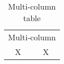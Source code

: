 \begin{table}[ht]
\caption{Multi-column table}
\begin{center}
\begin{tabular}{cc}
    \hline
    \multicolumn{2}{c}{Multi-column}\\
    X&X\\
    \hline
\end{tabular}
\end{center}
\label{tab:multicol}
\end{table}
